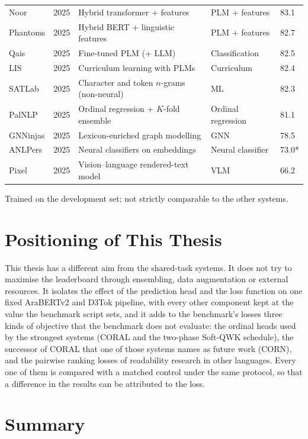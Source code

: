 \begin{table}[H]
\begin{tabular}{p{2.3cm} p{0.8cm} p{4.3cm} p{2.2cm} p{1.1cm}}
Noor & 2025 & Hybrid transformer + features & PLM + features & 83.1 \\
Phantoms & 2025 & Hybrid BERT + linguistic features & PLM + features & 82.7 \\
Qais & 2025 & Fine-tuned PLM (+ LLM) & Classification & 82.5 \\
LIS & 2025 & Curriculum learning with PLMs & Curriculum & 82.4 \\
SATLab & 2025 & Character and token $n$-grams (non-neural) & ML & 82.3 \\
PalNLP & 2025 & Ordinal regression + $K$-fold ensemble & Ordinal regression & 81.1 \\
GNNinjas & 2025 & Lexicon-enriched graph modelling & GNN & 78.5 \\
ANLPers & 2025 & Neural classifiers on embeddings & Neural classifier & 73.0* \\
Pixel & 2025 & Vision--language rendered-text model & VLM & 66.2 \\
\bottomrule
\end{tabular}

\vspace{0.15cm}
{\footnotesize * Trained on the development set; not strictly comparable to the other systems.}
\end{table}

\section{Positioning of This Thesis}
\label{sec:lit-position}

This thesis has a different aim from the shared-task systems. It does not try to maximise the
leaderboard through ensembling, data augmentation or external resources. It isolates the effect
of the prediction head and the loss function on one fixed AraBERTv2 and D3Tok pipeline, with
every other component kept at the value the benchmark script sets, and it adds to the
benchmark's losses three kinds of objective that the benchmark does not evaluate: the ordinal
heads used by the strongest systems (CORAL and the two-phase Soft-QWK schedule), the successor of
CORAL that one of those systems names as future work (CORN), and the pairwise ranking losses of
readability research in other languages. Every one of them is compared with a matched control
under the same protocol, so that a difference in the results can be attributed to the loss.

\section{Summary}

